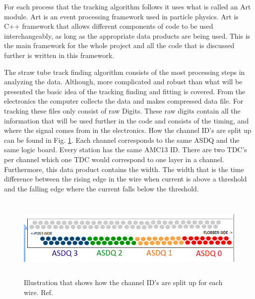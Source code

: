 \documentclass[./Thesis]{subfiles}
\begin{document}

For each process that the tracking algorithm follows it uses what is called an Art module. Art is an event processing framework used in particle physics.\cite{art}  Art is C++ framework that allows different components of code to be used interchangeably, as long as the appropriate data products are being used. This is the main framework for the whole project and all the code that is discussed further is written in this framework.

	The straw tube track finding algorithm consists of the most processing steps in analyzing the data.  Although, more complicated and robust than what will be presented the basic idea of the tracking finding and fitting is covered.  From the electronics the computer collects the data and makes compressed data file.  For tracking these files only consist of raw Digits.  These raw digits contain all the information that will be used further in the code and consists of the timing, and where the signal comes from in the electronics. How the channel ID's are split up can be found in Fig. \ref{fig:channelID}. Each channel corresponds to the same ASDQ and the same logic board. Every station has the same AMC13 ID. There are two TDC's per channel which one TDC would correspond to one layer in a channel. Furthermore, this data product contains the width. The width that is the time difference between the rising edge in the wire when current is above a threshold and the falling edge where the current falls below the threshold.

	
\begin{figure}
	\centerline{\includegraphics[height=40mm]{ADCSplitUp.png}}
	\caption[Top View of Tracker Electronics]{ Illustration that shows how the channel ID's are split up for each wire.  Ref. \cite{jPrice}
	}
	\label{fig:channelID}
\end{figure} 
\end{document}

